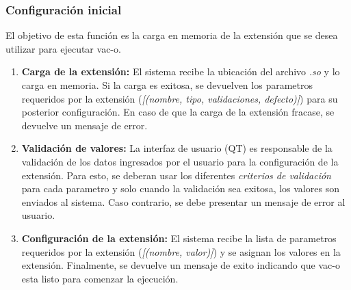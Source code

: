 \documentclass[10pt,a4paper]{article}
\begin{document}
  \subsubsection{Configuraci\'on inicial}
  El objetivo de esta funci\'on es la carga en memoria de la extensi\'on que se desea utilizar para ejecutar vac-o.
  \begin{enumerate}
    \item \textbf{Carga de la extensi\'on:}
    El sistema recibe la ubicaci\'on del archivo \textit{.so} y lo carga en memoria. Si la carga es exitosa, se devuelven los parametros requeridos por la extensi\'on (\textit{[(nombre, tipo, validaciones, defecto)]}) para su posterior configuraci\'on. En caso de que la carga de la extensi\'on fracase, se devuelve un mensaje de error.
    
    \item \textbf{Validaci\'on de valores:}
    La interfaz de usuario (QT) es responsable de la validaci\'on de los datos ingresados por el usuario para la configuraci\'on de la extensi\'on. Para esto, se deberan usar los diferentes \textit{criterios de validaci\'on} para cada parametro y solo cuando la validaci\'on sea exitosa, los valores son enviados al sistema. Caso contrario, se debe presentar un mensaje de error al usuario.
    
    \item \textbf{Configuraci\'on de la extensi\'on:}
    El sistema recibe la lista de parametros requeridos por la extensi\'on (\textit{[(nombre, valor)]}) y se asignan los valores en la extensi\'on. Finalmente, se devuelve un mensaje de exito indicando que vac-o esta listo para comenzar la ejecuci\'on.
  \end{enumerate}
\end{document}
